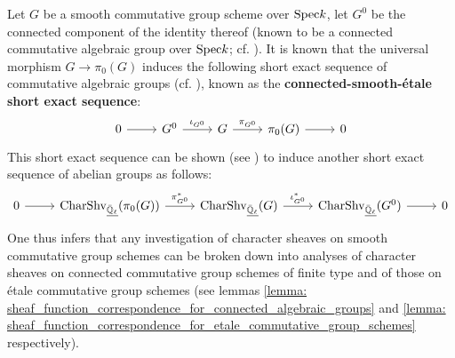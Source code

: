 \begin{remark}
                Let $G$ be a smooth commutative group scheme over $\mathrm{Spec} k$, let $G^0$ be the connected component of the identity thereof (known to be a connected commutative algebraic group over $\mathrm{Spec} k$; cf. \cite[Lemma 3.2]{cunningham_roe_function_sheaf_dictionary_quasi_characters_p_adic_tori}). It is known that the universal morphism $G \to \pi_0(G)$ induces the following short exact sequence of commutative algebraic groups (cf. \cite[Proposition 5.48]{milne_algebraic_groups}), known as the \textbf{connected-smooth-\'etale short exact sequence}:
                    $$
                        \begin{tikzcd}
                        	0 & {G^0} & G & {\pi_0(G)} & 0
                        	\arrow[from=1-1, to=1-2]
                        	\arrow["{\iota_{G^0}}", from=1-2, to=1-3]
                        	\arrow["{\pi_{G^0}}", from=1-3, to=1-4]
                        	\arrow[from=1-4, to=1-5]
                        \end{tikzcd}
                    $$
                This short exact sequence can be shown (see \cite[Proposition 3.3, Lemma 3.4, and Proposition 3.5]{cunningham_roe_function_sheaf_dictionary_quasi_characters_p_adic_tori}) to induce another short exact sequence of abelian groups as follows:
                    $$
                        \begin{tikzcd}
                        	0 & {\Char\Shv_{\underline{\bar{\Q}_{\ell}}}(\pi_0(G))} & {\Char\Shv_{\underline{\bar{\Q}_{\ell}}}(G)} & {\Char\Shv_{\underline{\bar{\Q}_{\ell}}}(G^0)} & 0
                        	\arrow[from=1-1, to=1-2]
                        	\arrow["{\pi_{G^0}^*}", from=1-2, to=1-3]
                        	\arrow["{\iota_{G^0}^*}", from=1-3, to=1-4]
                        	\arrow[from=1-4, to=1-5]
                        \end{tikzcd}
                    $$
                One thus infers that any investigation of character sheaves on smooth commutative group schemes can be broken down into analyses of character sheaves on connected commutative group schemes of finite type and of those on \'etale commutative group schemes (see lemmas \ref{lemma: sheaf_function_correspondence_for_connected_algebraic_groups} and \ref{lemma: sheaf_function_correspondence_for_etale_commutative_group_schemes} respectively).
            \end{remark}
